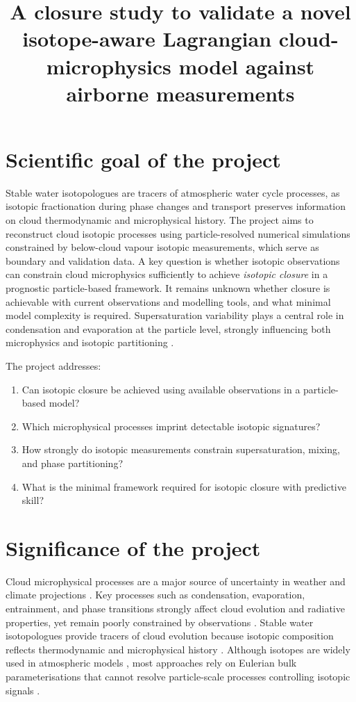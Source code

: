 \documentclass[11pt]{article}
\title{
    \textbf{A closure study to validate a novel isotope-aware
    Lagrangian cloud-microphysics model against airborne measurements}
}
\date{}
\begin{document}
\maketitle
\vspace{-1cm}
\section{Scientific goal of the project}
Stable water isotopologues are tracers of atmospheric water cycle processes, as isotopic fractionation during phase changes and transport preserves information on cloud thermodynamic and microphysical history.
The project aims to reconstruct cloud isotopic processes using particle-resolved numerical simulations constrained by below-cloud vapour isotopic measurements, which serve as boundary and validation data.
A key question is whether isotopic observations can constrain cloud microphysics sufficiently to achieve \emph{isotopic closure} in a prognostic particle-based framework. It remains unknown whether closure is achievable with current observations and modelling tools, and what minimal model complexity is required.
Supersaturation variability plays a central role in condensation and evaporation at the particle level, strongly influencing both microphysics and isotopic partitioning \parencite{2026_FahandezhSadi_EtAl}.

The project addresses:
\begin{enumerate}
    \item[\textbf{Q1}] Can isotopic closure be achieved using available observations in a particle-based model?
    \item[\textbf{Q2}] Which microphysical processes imprint detectable isotopic signatures?
    \item[\textbf{Q3}] How strongly do isotopic measurements constrain supersaturation, mixing, and phase partitioning?
    \item[\textbf{Q4}] What is the minimal framework required for isotopic closure with predictive skill?
\end{enumerate}


\section{Significance of the project}
Cloud microphysical processes are a major source of uncertainty in weather and climate projections \parencite{IPCC2021_WGI}. Key processes such as condensation, evaporation, entrainment, and phase transitions strongly affect cloud evolution and radiative properties, yet remain poorly constrained by observations \parencite{2013_Grabowski_Wang}.
Stable water isotopologues provide tracers of cloud evolution because isotopic composition reflects thermodynamic and microphysical history \parencite{2013_Bolot_EtAl}. Although isotopes are widely used in atmospheric models \parencite{2016_Galewsky_EtAl}, most approaches rely on Eulerian bulk parameterisations that cannot resolve particle-scale processes controlling isotopic signals \parencite{1984_Joussaume_EtAl, 2008_Yoshimura_EtAl, 2011_Werner_EtAl, 2016_Galewsky_EtAl}.
\end{document}
